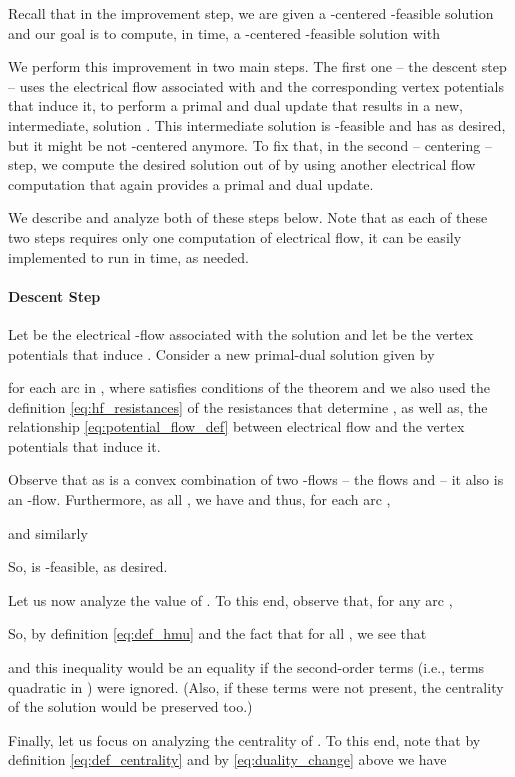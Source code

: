 \documentclass[11pt, letterpaper]{article}
\begin{document}
Recall that in the improvement step, we are given a -centered -feasible solution  and our goal is to compute, in  time, a -centered -feasible solution  with 


We perform this improvement in two main steps. The first one -- the descent step -- uses the electrical flow  associated with   and the corresponding vertex potentials  that induce it, to perform a primal and dual update that results in a new, intermediate, solution . This intermediate solution is -feasible and has  as desired, but it might be not -centered anymore. To fix that, in the second -- centering -- step, we compute the desired solution  out of  by using another electrical flow computation that again provides a primal and dual update.

 We describe and analyze both of these steps below. Note that as each of these two steps requires only one computation of electrical flow, it can be easily implemented to run in  time, as needed.

\paragraph{Descent Step}

Let  be the electrical -flow associated with the solution  and let  be the vertex potentials that induce . Consider a new primal-dual solution  given by

for each arc  in , where  satisfies conditions of the theorem and we also used the definition \eqref{eq:hf_resistances} of the resistances that determine , as well as, the relationship \eqref{eq:potential_flow_def} between electrical flow and the vertex potentials that induce it. 


Observe that as  is a convex combination of two -flows -- the flows  and  -- it also is an -flow.  Furthermore, as all , we have  and thus, for each arc ,

and similarly

So,  is -feasible, as desired.

Let us now analyze the value of . To this end, observe that, for any arc ,

So, by definition \eqref{eq:def_hmu} and the fact that  for all , we see that 

and this inequality would be an equality if the second-order terms (i.e., terms quadratic in ) were ignored. (Also, if these terms were not present, the centrality of the solution would be preserved too.)

Finally, let us focus on analyzing the centrality of . To this end,  note that by definition \eqref{eq:def_centrality} and by \eqref{eq:duality_change} above we have
\end{document}
